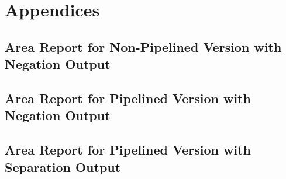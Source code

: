 \section{Appendices}
\subsection{Area Report for Non-Pipelined Version with Negation Output}
\label{sec:ap_1}
{
	\footnotesize{
		
	}
}
\subsection{Area Report for Pipelined Version with Negation Output}
\label{sec:ap_2}

{
	\footnotesize{
		
	}
}
\subsection{Area Report for Pipelined Version with Separation Output}
\label{sec:ap_3}

{
	\footnotesize{
		
	}
}